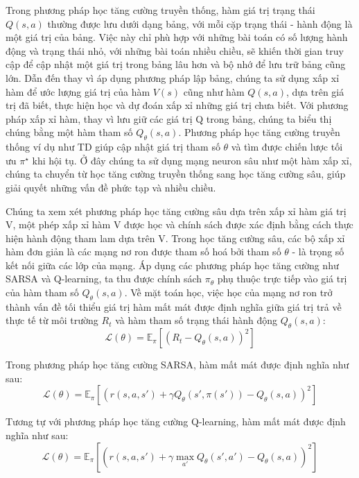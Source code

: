 \documentclass{uetgraduation}
\begin{document}
Trong phương pháp học tăng cường truyền thống, hàm giá trị trạng thái $Q(s, a)$ thường được lưu dưới dạng bảng, với mỗi cặp trạng thái - hành động là một giá trị của bảng. Việc này
chỉ phù hợp với những bài toán có số lượng hành động và trạng thái nhỏ, với những bài toán nhiều chiều, sẽ khiến thời gian truy cập để cập nhật một giá trị trong bảng lâu hơn và bộ nhớ để
lưu trữ bảng cũng lớn. Dẫn đến thay vì áp dụng phương pháp lập bảng, chúng ta sử dụng xấp xỉ hàm để ước lượng giá trị của hàm $V(s)$ cũng như hàm $Q(s, a)$, dựa trên giá trị đã biết, thực hiện 
học và dự đoán xấp xỉ những giá trị chưa biết. Với phương pháp xấp xỉ hàm, thay vì lưu giữ các giá trị Q trong bảng, chúng ta biểu thị chúng bằng một hàm tham số $Q_\theta (s, a)$. Phương
pháp học tăng cường truyền thống ví dụ như TD giúp cập nhật giá trị tham số $\theta$ và tìm được chiến lược tối ưu $\pi^\star$ khi hội tụ. Ở đây chúng ta sử dụng mạng neuron sâu như một hàm
xấp xỉ, chúng ta chuyển từ học tăng cường truyền thống sang học tăng cường sâu, giúp giải quyết những vấn đề phức tạp và nhiều chiều.

Chúng ta xem xét phương pháp học tăng cường sâu dựa trên xấp xỉ hàm giá trị V, một phép xấp xỉ hàm V được học và chính sách được xác định bằng cách thực hiện hành động tham lam dựa trên V.
Trong học tăng cường sâu, các bộ xấp xỉ hàm đơn giản là các mạng nơ ron được tham số hoá bởi tham số $\theta$ - là trọng số kết nối giữa các lớp của mạng. Áp dụng các phương pháp học tăng
cường như SARSA và Q-learning, ta thu được chính sách $\pi_\theta$ phụ thuộc trực tiếp vào giá trị của hàm tham số $Q_\theta (s, a)$. Về mặt toán học, việc học của mạng nơ ron trở thành
vấn đề tối thiểu giá trị hàm mất mát được định nghĩa giữa giá trị trả về thực tế từ môi trường $R_t$ và hàm tham số trạng thái hành động $Q_\theta (s, a)$:
\begin{equation}
    \mathcal{L(\theta)} = \mathbb{E}_\pi [(R_t - Q_\theta (s, a))^2]
\end{equation}

Trong phương pháp học tăng cường SARSA, hàm mất mát được định nghĩa như sau:
\begin{equation}
    \mathcal{L(\theta)} = \mathbb{E}_\pi [(r(s, a, s') + \gamma Q_\theta (s', \pi(s')) - Q_\theta (s, a))^2]
\end{equation}

Tương tự với phương pháp học tăng cường Q-learning, hàm mất mát được định nghĩa như sau:
\begin{equation}
    \mathcal{L(\theta)} = \mathbb{E}_\pi [(r(s, a, s') + \gamma \max_{a'} Q_\theta (s', a') - Q_\theta (s, a))^2]
\end{equation}
\end{document}
